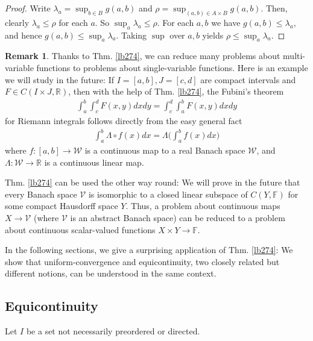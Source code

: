 \documentclass[12pt,b5paper,notitlepage]{article}
\theoremstyle{definition}
\newtheorem{rem}[df]{Remark}
\theoremstyle{plain}
\newcommand{\mc}{\mathcal}
\newcommand{\Rbb}{\mathbb R}
\newcommand{\Fbb}{\mathbb F}
\numberwithin{equation}{section}
\begin{document}
\begin{proof}
Write $\lambda_a=\sup_{b\in B}g(a,b)$ and $\rho=\sup_{(a,b)\in A\times B}g(a,b)$. Then, clearly $\lambda_a\leq\rho$ for each $a$. So $\sup_a\lambda_a\leq\rho$. For each $a,b$ we have $g(a,b)\leq \lambda_a$, and hence $g(a,b)\leq \sup_a\lambda_a$. Taking $\sup$ over $a,b$ yields $\rho\leq\sup_a\lambda_a$.
\end{proof}





\begin{rem}
Thanks to Thm. \ref{lb274}, we can reduce many problems about multi-variable functions to problems about single-variable functions. Here is an example we will study in the future: If $I=[a,b],J=[c,d]$ are compact intervals and $F\in C(I\times J,\Rbb)$, then with the help of Thm. \ref{lb274}, the Fubini's theorem
\begin{align*}
\int_a^b \int_c^d F(x,y)dxdy=\int_c^d\int_a^b F(x,y)dxdy
\end{align*}
for Riemann integrals follows directly from the easy general fact
\begin{align*}
\int_a^b\Lambda\circ f(x)dx=\Lambda\Big(\int_a^b f(x)dx \Big)
\end{align*}
where $f:[a,b]\rightarrow\mc W$ is a continuous map to a real Banach space $\mc W$, and $\Lambda:\mc W\rightarrow\Rbb$ is a continuous linear map.

Thm. \ref{lb274} can be used the other way round: We will prove in the future that every Banach space $\mc V$ is isomorphic to a closed linear subspace of $C(Y,\Fbb)$ for some compact Hausdorff space $Y$. Thus, a problem about continuous maps $X\rightarrow \mc V$ (where $\mc V$ is an abstract Banach space) can be reduced to a problem about continuous scalar-valued functions $X\times Y\rightarrow\Fbb$. \hfill\qedsymbol
\end{rem}


In the following sections, we give a surprising application of Thm. \ref{lb274}: We show that uniform-convergence and equicontinuity, two closely related but different notions, can be understood in the same context.

\subsection{Equicontinuity}

Let $I$ be a set not necessarily preordered or directed.
\end{document}
